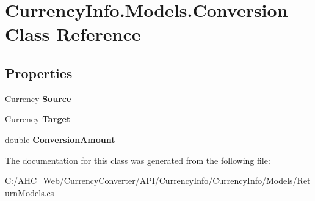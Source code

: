 \hypertarget{class_currency_info_1_1_models_1_1_conversion}{\section{Currency\-Info.\-Models.\-Conversion Class Reference}
\label{class_currency_info_1_1_models_1_1_conversion}
}
\subsection*{Properties}
\begin{DoxyCompactItemize}
\item 
\hypertarget{class_currency_info_1_1_models_1_1_conversion_afdc8bb8ad3829cf36c4aff1d79ec4116}{\hyperlink{class_currency_info_1_1_models_1_1_currency}{Currency} {\bfseries Source}}\label{class_currency_info_1_1_models_1_1_conversion_afdc8bb8ad3829cf36c4aff1d79ec4116}

\item 
\hypertarget{class_currency_info_1_1_models_1_1_conversion_aed557d3b1d21a52b4a503fe31dbdf6cb}{\hyperlink{class_currency_info_1_1_models_1_1_currency}{Currency} {\bfseries Target}}\label{class_currency_info_1_1_models_1_1_conversion_aed557d3b1d21a52b4a503fe31dbdf6cb}

\item 
\hypertarget{class_currency_info_1_1_models_1_1_conversion_a7b14589f3d6ed5a3dc57d34a779e40f8}{double {\bfseries Conversion\-Amount}}\label{class_currency_info_1_1_models_1_1_conversion_a7b14589f3d6ed5a3dc57d34a779e40f8}

\end{DoxyCompactItemize}


The documentation for this class was generated from the following file\-:\begin{DoxyCompactItemize}
\item 
C\-:/\-A\-H\-C\-\_\-\-Web/\-Currency\-Converter/\-A\-P\-I/\-Currency\-Info/\-Currency\-Info/\-Models/Return\-Models.\-cs\end{DoxyCompactItemize}
